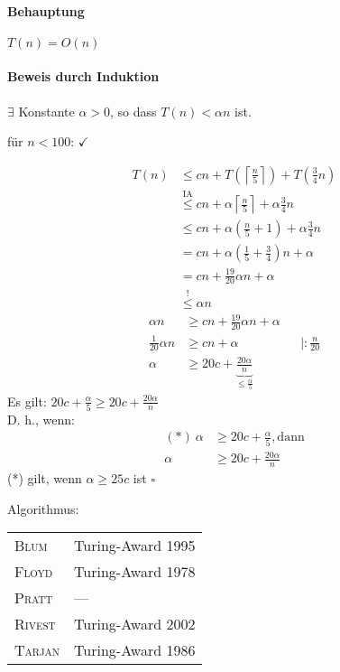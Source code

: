 \begin{description}
		\paragraph{Behauptung} $T(n) = O(n)$
		\paragraph{Beweis durch Induktion}
			\begin{description}
			 \item[Behauptung] $\exists$ Konstante $\alpha > 0$, so dass $T(n) < \alpha n$ ist.
			 \item für $n < 100$: $\checkmark$
			 \item[Induktionsschritt] 
				\begin{align*}
				 T(n) &\leq cn + T\left(\left\lceil\frac{n}{5}\right\rceil\right) + T\left(\frac{3}{4} n\right) \\
					  &\overset{\text{IA}}{\leq } cn + \alpha \left\lceil\frac{n}{5}\right\rceil + \alpha \frac{3}{4} n\\
					  &\leq cn + \alpha \left(\frac{n}{5} + 1\right) + \alpha \frac{3}{4} n \\
					  &= cn + \alpha \left(\frac{1}{5} +  \frac{3}{4}\right)n + \alpha \\
					  &= cn + \frac{19}{20} \alpha n + \alpha \\
					  &\overset{!}{\leq} \alpha n
				\end{align*}
				\begin{align*}
				 \alpha n &\geq cn + \frac{19}{20} \alpha n + \alpha\\
				 \frac{1}{20} \alpha n & \geq cn + \alpha &&| : \frac{n}{20} \\
				 \alpha & \geq 20c + \underbrace{\frac{20\alpha}{n}}_{\leq \frac{\alpha}{5}}
				\end{align*}
				Es gilt: $20 c + \frac{\alpha}{5} \geq 20c + \frac{20\alpha}{n}$ \\
				D. h., wenn:
					\begin{align*}
					(*)\ \alpha &\geq 20c + \frac{\alpha}{5}, \text{dann} \\
					\alpha &\geq 20c + \frac{20\alpha}{n}
					\end{align*}
					(*) gilt, wenn $\alpha \geq 25c$ ist \hfill$\square$
			\end{description}
		Algorithmus:
		\begin{center}
		 \begin{tabular}{ll}
			\textsc{Blum} & Turing-Award 1995 \\
			\textsc{Floyd} & Turing-Award 1978 \\
			\textsc{Pratt} & --- \\
			\textsc{Rivest} & Turing-Award 2002 \\
			\textsc{Tarjan} & Turing-Award 1986 
		 \end{tabular}
		\end{center}

\end{description}
